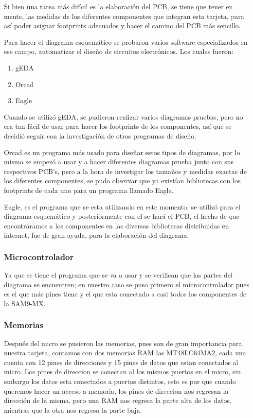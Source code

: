 Si bien una tarea más difícil es la elaboración del PCB, se tiene
que tener en mente, las medidas de los diferentes componentes que
integran esta tarjeta, para así poder asignar footprints adecuados
y hacer el camino del PCB más sencillo.

Para hacer el diagrama esquemático se probaron varios software especializados
en ese campo, automatizar el diseño de circuitos electrónicos. Los
cuales fueron:
\begin{enumerate}
\item gEDA
\item Orcad
\item Eagle
\end{enumerate}
Cuando se utilizó gEDA, se pudieron realizar varios diagramas pruebas,
pero no era tan fácil de usar para hacer los footprints de los componentes,
así que se decidió seguir con la investigación de otros programas
de diseño.

Orcad es un programa más usado para diseñar estos tipos de diagramas,
por lo mismo se empezó a usar y a hacer diferentes diagramas prueba
junto con sus respectivos PCB's, pero a la hora de investigar los
tamaños y medidas exactas de los diferentes componentes, se pudo observar
que ya existían bibliotecas con los footprints de cada uno para un
programa llamado Eagle.

Eagle, es el programa que se esta utilizando en este momento, se utilizó
para el diagrama esquemático y posteriormente con el se hará el PCB,
el hecho de que encontráramos a los componentes en las diversas bibliotecas
distribuidas en internet, fue de gran ayuda, para la elaboración del
diagrama.

\pagebreak{}


\subsubsection*{Microcontrolador}

Ya que se tiene el programa que se va a usar y se verifican que las
partes del diagrama se encuentren; en nuestro caso se puso primero
el microcontrolador pues es el que más pines tiene y el que esta conectado
a casi todos los componentes de la \ac{SAM}9-MX.


\subsubsection*{Memorias}

Después del micro se pusieron las memorias, pues son de gran importancia
para nuestra tarjeta, contamos con dos memorias RAM las MT48LC64MA2,
cada una cuenta con 12 pines de direcciones y 15 pines de datos que
estan conectados al micro. Los pines de direccion se conectan al los
mismos puertos en el micro, sin embargo los datos esta conectados
a puertos distintos, esto es por que cuando queremos hacer un acceso
a memoria, los pines de direccion nos regresan la dirección de la
misma, pero una RAM nos regresa la parte alta de los datos, mientras
que la otra nos regresa la parte baja. 

